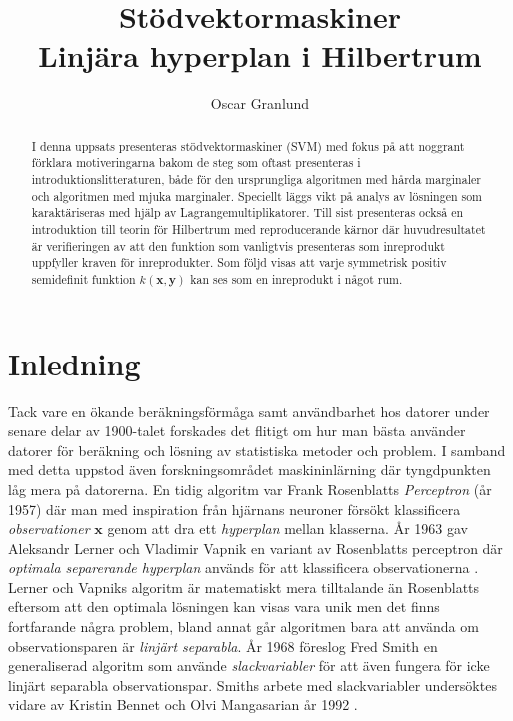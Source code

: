 \documentclass[a4paper, 12pt]{report}
\title{Stödvektormaskiner\\
{\large Linjära hyperplan i Hilbertrum}}
\author{Oscar Granlund}
\theoremstyle{definition}
\theoremstyle{remark}
\newcommand{\bfx}{\mathbf{x}}
\newcommand{\bfy}{\mathbf{y}}
\begin{document}
\maketitle

\begin{abstract}
	I denna uppsats presenteras stödvektormaskiner (SVM) med fokus på att noggrant förklara motiveringarna bakom de steg som oftast presenteras i introduktionslitteraturen, både för den ursprungliga algoritmen med hårda marginaler och algoritmen med mjuka marginaler. Speciellt läggs vikt på analys av lösningen som karaktäriseras med hjälp av Lagrangemultiplikatorer. Till sist presenteras också en introduktion till teorin för Hilbertrum med reproducerande kärnor där huvudresultatet är verifieringen av att den funktion som vanligtvis presenteras som inreprodukt uppfyller kraven för inreprodukter. Som följd visas att varje symmetrisk positiv semidefinit funktion $k\left(\bfx,\bfy\right)$ kan ses som en inreprodukt i något rum.
\end{abstract}

\chapter{Inledning}
Tack vare en ökande beräkningsförmåga samt användbarhet hos datorer under senare delar av 1900-talet forskades det flitigt om hur man bästa använder datorer för beräkning och lösning av statistiska metoder och problem.
I samband med detta uppstod även forskningsområdet maskininlärning där tyngdpunkten låg mera på datorerna.
En tidig algoritm var Frank Rosenblatts \emph{Perceptron} (år 1957) \cite{Rosenblatt} där man med inspiration från hjärnans neuroner försökt klassificera \emph{observationer} $\mathbf{x}$ genom att dra ett \emph{hyperplan} mellan klasserna.
År 1963 gav Aleksandr Lerner och Vladimir Vapnik en variant av Rosenblatts perceptron där \emph{optimala separerande hyperplan} används för att klassificera observationerna \cite{VapnikLerner1963}.
Lerner och Vapniks algoritm är matematiskt mera tilltalande än Rosenblatts eftersom att den optimala lösningen kan visas vara unik men det finns fortfarande några problem, bland annat går algoritmen bara att använda om observationsparen är \emph{linjärt separabla}.
År 1968 föreslog Fred Smith \cite{Smith} en generaliserad algoritm som använde \emph{slackvariabler} för att även fungera för icke linjärt separabla observationspar.
Smiths arbete med slackvariabler undersöktes vidare av Kristin Bennet och Olvi Mangasarian år 1992 \cite{BennetMangasarian}.
\end{document}
